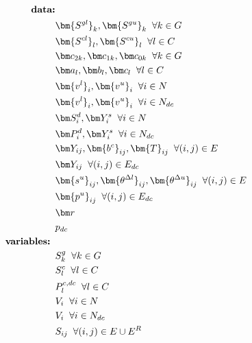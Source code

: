 \documentclass{article}
\begin{document}
\begin{align}
%
\mbox{\bf data:} & \nonumber \\ 
& \bm {S^{gl}}_k, \bm {S^{gu}}_k \;\; \forall k \in G \nonumber \\
& \bm {S^{cl}}_l, \bm {S^{cu}}_l \;\; \forall l \in C \nonumber \\
& \bm c_{2k}, \bm c_{1k}, \bm c_{0k} \;\; \forall k \in G \nonumber \\
& \bm a_l, \bm b_l, \bm c_l \;\; \forall l \in C \nonumber \\
& \bm {v^l}_i, \bm {v^u}_i \;\; \forall i \in N \nonumber \\
& \bm {v^l}_i, \bm {v^u}_i \;\; \forall i \in N_{dc} \nonumber \\
& \bm S^d_i, \bm Y^s_{i} \;\; \forall i \in N \nonumber \\
& \bm P^d_i, \bm Y^s_{i} \;\; \forall i \in N_{dc} \nonumber \\
& \bm Y_{ij}, \bm {b^c}_{ij}, \bm{T}_{ij} \;\; \forall (i,j) \in E \nonumber \\
& \bm Y_{ij} \;\; \forall (i,j) \in E_{dc} \nonumber \\
& \bm {s^u}_{ij}, \bm {\theta^{\Delta l}}_{ij}, \bm {\theta^{\Delta u}}_{ij} \;\; \forall (i,j) \in E \nonumber \\
& \bm {p^u}_{ij} \;\; \forall (i,j) \in E_{dc} \nonumber \\
& \bm r \nonumber \\
& p_{dc} \nonumber \\
%
\mbox{\bf variables: } & \nonumber \\
& S^g_k \;\; \forall k\in G \nonumber \\
& S^c_l \;\; \forall l\in C \nonumber \\
& P^{c, dc}_l \;\; \forall l\in C \nonumber \\
& V_i \;\; \forall i\in N \nonumber \\
& V_i \;\; \forall i\in N_{dc} \nonumber \\
& S_{ij} \;\; \forall (i,j) \in E \cup E^R \nonumber \\
%
\end{align} \\
\end{document}
